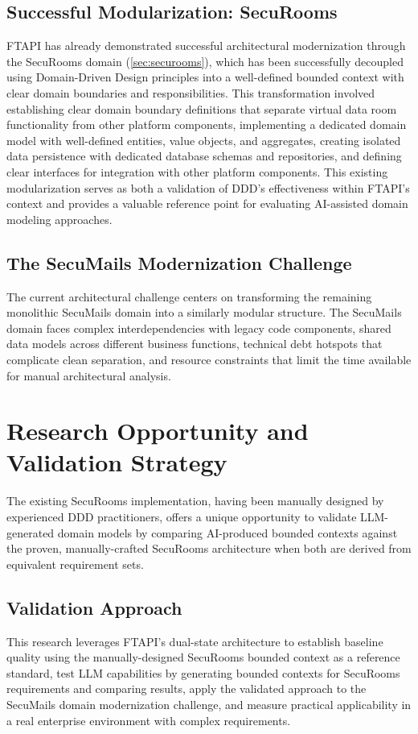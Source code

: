 \subsection{Successful Modularization: SecuRooms}
FTAPI has already demonstrated successful architectural modernization through the SecuRooms domain (\autoref{sec:securooms}), which has been successfully decoupled using Domain-Driven Design principles into a well-defined bounded context with clear domain boundaries and responsibilities. This transformation involved establishing clear domain boundary definitions that separate virtual data room functionality from other platform components, implementing a dedicated domain model with well-defined entities, value objects, and aggregates, creating isolated data persistence with dedicated database schemas and repositories, and defining clear interfaces for integration with other platform components.
This existing modularization serves as both a validation of DDD's effectiveness within FTAPI's context and provides a valuable reference point for evaluating AI-assisted domain modeling approaches.

\subsection{The SecuMails Modernization Challenge}
The current architectural challenge centers on transforming the remaining monolithic SecuMails domain into a similarly modular structure. The SecuMails domain faces complex interdependencies with legacy code components, shared data models across different business functions, technical debt hotspots that complicate clean separation, and resource constraints that limit the time available for manual architectural analysis.

\section{Research Opportunity and Validation Strategy}
The existing SecuRooms implementation, having been manually designed by experienced DDD practitioners, offers a unique opportunity to validate LLM-generated domain models by comparing AI-produced bounded contexts against the proven, manually-crafted SecuRooms architecture when both are derived from equivalent requirement sets.

\subsection{Validation Approach}
This research leverages FTAPI's dual-state architecture to establish baseline quality using the manually-designed SecuRooms bounded context as a reference standard, test LLM capabilities by generating bounded contexts for SecuRooms requirements and comparing results, apply the validated approach to the SecuMails domain modernization challenge, and measure practical applicability in a real enterprise environment with complex requirements.

